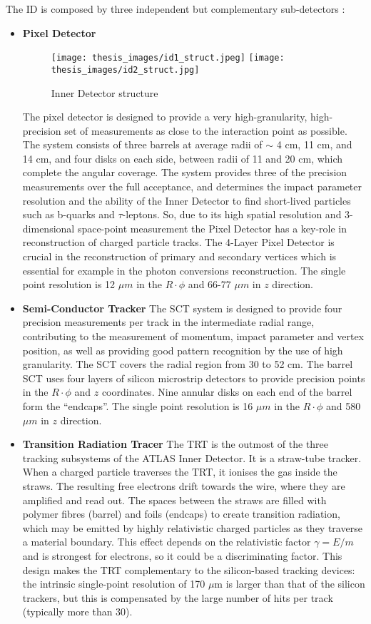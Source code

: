 \documentclass[a4paper, oneside, 11pt, openright]{book}
\begin{document}
				The ID is composed by three independent but complementary sub-detectors \cite{ID_report}:
				\begin{itemize}
					\item \textbf{Pixel Detector}
						\begin{figure}
							\centering
							\texttt{[image: thesis\_images/id1\_struct.jpeg]}
							\texttt{[image: thesis\_images/id2\_struct.jpg]}
							\caption{Inner Detector structure}
						\end{figure}
						The pixel detector is designed to provide a very high-granularity, high-precision set of measurements as close to the interaction point as possible. The system consists of three barrels at average radii of $\sim$ 4 cm, 11 cm, and 14 cm, and four disks
						on each side, between radii of 11 and 20 cm, which complete the angular coverage. The system provides three of the precision measurements over the full acceptance, and determines the impact parameter resolution and the ability of the Inner Detector to find short-lived particles such as b-quarks and $\tau$-leptons. So, due to its high spatial resolution and 3-dimensional space-point measurement the Pixel Detector has a key-role in reconstruction of charged particle tracks. The 4-Layer Pixel Detector is crucial in the reconstruction of primary and secondary vertices which is essential for example in the photon conversions reconstruction. The single point resolution is 12 $\mu m$ in the $R\cdot\phi$ and 66-77 $\mu m$ in $z$ direction.
					\item \textbf{Semi-Conductor Tracker}
						The SCT system is designed to provide four precision measurements per track in the intermediate radial range, contributing to the measurement of momentum, impact parameter and vertex position, as well as providing good pattern recognition by the use of high granularity. The SCT covers the radial region from 30 to 52 cm. The barrel SCT uses four layers of silicon microstrip detectors to provide precision points in the $R\cdot\phi$ and $z$ coordinates. Nine annular disks on each end of the barrel form the “endcaps”. The single point resolution is 16 $\mu m$ in the $R\cdot\phi$ and 580 $\mu m$ in $z$ direction.
					\item \textbf{Transition Radiation Tracer} 
						 The TRT is the outmost of the three tracking subsystems of the ATLAS Inner Detector. It is a straw-tube tracker. When a charged particle traverses the TRT, it ionises the gas inside the straws. The resulting free electrons drift towards the wire, where they are amplified and read out. The spaces between the straws are filled with polymer fibres (barrel) and foils (endcaps) to create transition radiation, which may be emitted by highly relativistic charged particles as they traverse a material boundary.   This effect depends on the relativistic factor $\gamma=E/m$ and is strongest for electrons, so it could be a discriminating factor. This design  makes the TRT complementary to  the silicon-based tracking devices:  the intrinsic single-point resolution of 170 $\mu$m is larger than that of the silicon trackers, but this is compensated by the large number of hits per track (typically more than 30). 
						

\end{itemize}
\end{document}
